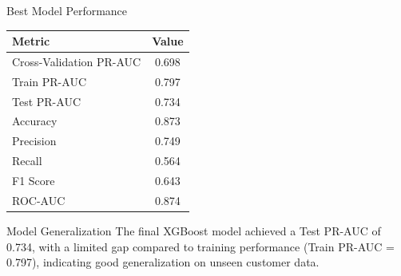 \begin{frame}{Best Model Performance}

\centering

\small
\begin{tabular}{lc}
\hline
\textbf{Metric} & \textbf{Value} \\
\hline
Cross-Validation PR-AUC & 0.698 \\
Train PR-AUC & 0.797 \\
Test PR-AUC & 0.734 \\
Accuracy & 0.873 \\
Precision & 0.749 \\
Recall & 0.564 \\
F1 Score & 0.643 \\
ROC-AUC & 0.874 \\
\hline
\end{tabular}

\vspace{0.35cm}

\begin{block}{Model Generalization}
\small
The final XGBoost model achieved a Test PR-AUC of 0.734,
with a limited gap compared to training performance (Train PR-AUC = 0.797),
indicating good generalization on unseen customer data.
\end{block}

\end{frame}


